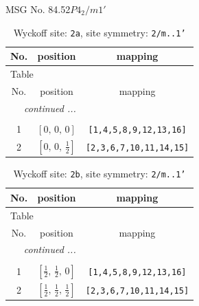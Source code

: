 \documentclass[fleqn,8pt]{jsarticle}
\begin{document}
\setcounter{MaxMatrixCols}{32}

\renewcommand{\tablename}{Table~}
\renewcommand{\figurename}{Figure~}
\begin{center}
\LARGE
MSG No. 84.52\quad$P4_{2}/m1'$
\end{center}
\renewcommand{\arraystretch}{1.2}
\begin{longtable}{ccc}
\caption{Wyckoff site: {\tt 2a}, site symmetry: {\tt 2/m..1'}}
 \\
 \hline \hline
No. & position & mapping \\ \hline \endfirsthead

\multicolumn{2}{l}{\tablename\ \thetable{}} \\
 \hline \hline
No. & position & mapping \\ \hline \endhead

 \hline \hline
\multicolumn{2}{r}{\footnotesize\it continued ...} \\ \endfoot

 \hline \hline
\multicolumn{2}{r}{} \\ \endlastfoot

1 & $\left[ 0,\, 0,\, 0 \right]$ & {\tt [1,4,5,8,9,12,13,16]} \\ \hline
2 & $\left[ 0,\, 0,\, \frac{1}{2} \right]$ & {\tt [2,3,6,7,10,11,14,15]} \\
\end{longtable}
\renewcommand{\arraystretch}{1.2}
\begin{longtable}{ccc}
\caption{Wyckoff site: {\tt 2b}, site symmetry: {\tt 2/m..1'}}
 \\
 \hline \hline
No. & position & mapping \\ \hline \endfirsthead

\multicolumn{2}{l}{\tablename\ \thetable{}} \\
 \hline \hline
No. & position & mapping \\ \hline \endhead

 \hline \hline
\multicolumn{2}{r}{\footnotesize\it continued ...} \\ \endfoot

 \hline \hline
\multicolumn{2}{r}{} \\ \endlastfoot

1 & $\left[ \frac{1}{2},\, \frac{1}{2},\, 0 \right]$ & {\tt [1,4,5,8,9,12,13,16]} \\ \hline
2 & $\left[ \frac{1}{2},\, \frac{1}{2},\, \frac{1}{2} \right]$ & {\tt [2,3,6,7,10,11,14,15]} \\
\end{longtable}
\end{document}
